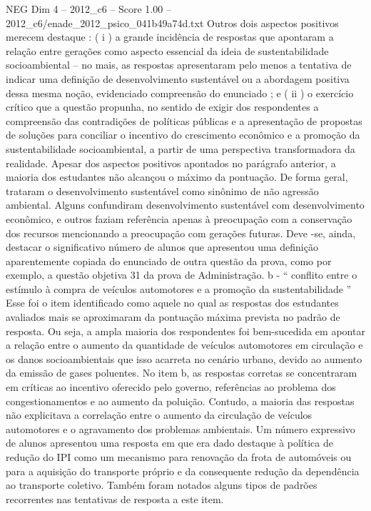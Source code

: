 \begin{textsample}{NEG Dim 4 – 2012\_c6 – Score 1.00 – 2012\_c6/enade\_2012\_psico\_041b49a74d.txt}
Outros dois aspectos positivos merecem destaque : ( i ) a grande incidência de respostas que apontaram a relação entre gerações como aspecto essencial da ideia de sustentabilidade socioambiental – no mais, as respostas apresentaram pelo menos a tentativa de indicar uma definição de desenvolvimento sustentável ou a abordagem positiva dessa mesma noção, evidenciado compreensão do enunciado ; e ( ii ) o exercício crítico que a questão propunha, no sentido de exigir dos respondentes a compreensão das contradições de políticas públicas e a apresentação de propostas de soluções para conciliar o incentivo do crescimento econômico e a promoção da sustentabilidade socioambiental, a partir de uma perspectiva transformadora da realidade.
Apesar dos aspectos positivos apontados no parágrafo anterior, a maioria dos estudantes não alcançou o máximo da pontuação.
De forma geral, trataram o desenvolvimento sustentável como sinônimo de não agressão ambiental.
Alguns confundiram desenvolvimento sustentável com desenvolvimento econômico, e outros faziam referência apenas à preocupação com a conservação dos recursos mencionando a preocupação com gerações futuras.
Deve -se, ainda, destacar o significativo número de alunos que apresentou uma definição aparentemente copiada do enunciado de outra questão da prova, como por exemplo, a questão objetiva 31 da prova de Administração. b - “ conflito entre o estímulo à compra de veículos automotores e a promoção da sustentabilidade ” Esse foi o item identificado como aquele no qual as respostas dos estudantes avaliados mais se aproximaram da pontuação máxima prevista no padrão de resposta.
Ou seja, a ampla maioria dos respondentes foi bem-sucedida em apontar a relação entre o aumento da quantidade de veículos automotores em circulação e os danos socioambientais que isso acarreta no cenário urbano, devido ao aumento da emissão de gases poluentes.
No item b, as respostas corretas se concentraram em críticas ao incentivo oferecido pelo governo, referências ao problema dos congestionamentos e ao aumento da poluição.
Contudo, a maioria das respostas não explicitava a correlação entre o aumento da circulação de veículos automotores e o agravamento dos problemas ambientais.
Um número expressivo de alunos apresentou uma resposta em que era dado destaque à política de redução do IPI como um mecanismo para renovação da frota de automóveis ou para a aquisição do transporte próprio e da consequente redução da dependência ao transporte coletivo.
Também foram notados alguns tipos de padrões recorrentes nas tentativas de resposta a este item.

\end{textsample}
